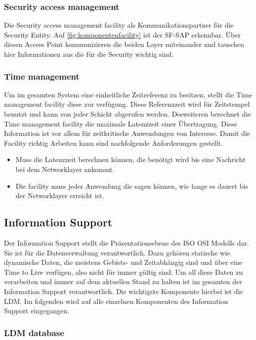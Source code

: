 \subsubsection{Security access management \label{facilitylayer_AccessManagement}}
Die Security access management facility als Kommunikationspartner für die Security Entity. Auf \autoref{fig:komponentenfacility} ist der SF-SAP erkennbar. Über diesen Access Point kommunizieren die beiden Layer miteinander und tauschen hier Informationen aus die für die Security wichtig sind. 

\subsubsection{Time management \label{facilitylayer_TimeManagement}}
Um im gesamten System eine einheitliche Zeitreferenz zu besitzen, stellt die Time management facility diese zur verfügung. Diese Referenzzeit wird für Zeitstempel benutzt und kann von jeder Schicht abgerufen werden. Desweiteren  berechnet die Time management facility die maximale Latenzzeit einer Übertragung. Diese Information ist vor allem für zeitkritische Anwendungen von Interesse.
Damit die Facility richtig Arbeiten kann sind nachfolgende Anforderungen gestellt.
\begin{itemize}
\item Muss die Latenzzeit berechnen können, die benötigt wird bis eine Nachricht bei dem Networklayer ankommt. 
\item Die facility muss jeder Anwendung die sagen können, wie lange es dauert bis der Networklayer erreicht ist. 
\end{itemize}

\subsection{Information Support}
Der Information Support stellt die Präsentationsebene des \acs{ISO} \acs{OSI} Modells dar. Sie ist für die Datenverwaltung verantwortlich. Dazu gehören statische wie dynamische Daten, die meistens Gebiets- und Zeitabhängig sind und über eine Time to Live verfügen, also nicht für immer gültig sind. Um all diese Daten zu verarbeiten und immer auf dem aktuellen Stand zu halten ist im gesamten der Information Support verantwortlich. Die wichtigste Komponente hierbei ist die \acl{LDM}. Im folgenden wird auf alle einzelnen Komponenten des Information Support eingegangen. 

\subsubsection{LDM database \label{facilitylayer_ldmdatabase}}

